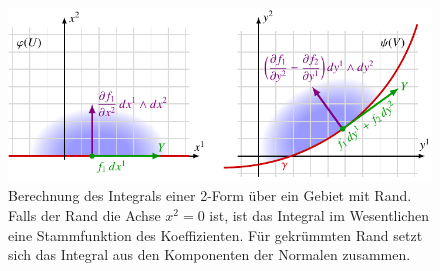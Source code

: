 %
%
%
\begin{figure}
\centering
\includegraphics{chapters/040-green/images/greenrand2d.pdf}
\caption{Berechnung des Integrals einer 2-Form über ein Gebiet mit Rand.
Falls der Rand die Achse $x^2=0$ ist, ist das Integral im Wesentlichen
eine Stammfunktion des Koeffizienten.
Für gekrümmten Rand setzt sich das Integral aus den Komponenten der
Normalen zusammen.
\label{buch:green:green:fig:greenrand2d}}
\end{figure}

